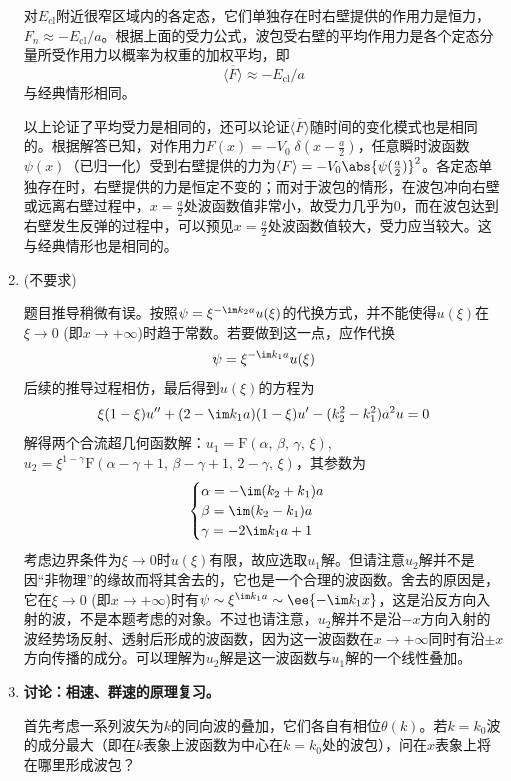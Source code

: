 \begin{enumerate}[label=\textbf{4.\arabic*}, listparindent=\parindent]
对$E_\mathrm{cl}$附近很窄区域内的各定态，它们单独存在时右壁提供的作用力是恒力，$F_n \approx -E_\mathrm{cl}/a$。根据上面的受力公式，波包受右壁的平均作用力是各个定态分量所受作用力以概率为权重的加权平均，即
\[\overline{\langle F\rangle} \approx -E_\mathrm{cl}/a\]
与经典情形相同。

以上论证了平均受力是相同的，还可以论证$\overline{\langle F\rangle}$随时间的变化模式也是相同的。根据解答已知，对作用力$F(x) = -V_0\;\delta(x-\frac{a}{2})$，任意瞬时波函数$\psi(x)$（已归一化）受到右壁提供的力为$\langle F\rangle = -V_0\abs{\psi(\frac{a}{2})}^2$。各定态单独存在时，右壁提供的力是恒定不变的；而对于波包的情形，在波包冲向右壁或远离右壁过程中，$x=\frac{a}{2}$处波函数值非常小，故受力几乎为0，而在波包达到右壁发生反弹的过程中，可以预见$x=\frac{a}{2}$处波函数值较大，受力应当较大。这与经典情形也是相同的。

\setcounter{enumi}{11}
\item (不要求)

题目推导稍微有误。按照$\psi = \xi^{-\im k_2 a}u(\xi)$的代换方式，并不能使得$u(\xi)$在$\xi\rightarrow 0$ (即$x\rightarrow+\infty$)时趋于常数。若要做到这一点，应作代换
\[\psi = \xi^{-\im k_1 a}u(\xi)\]
后续的推导过程相仿，最后得到$u(\xi)$的方程为
\[\xi(1-\xi)u''+(2-\im k_1 a)(1-\xi)u'-(k_2^2-k_1^2)a^2 u =0\]
解得两个合流超几何函数解：$u_1 = \mathrm{F}(\alpha,\,\beta,\,\gamma,\,\xi)$, $u_2 = \xi^{1-\gamma}\mathrm{F}(\alpha-\gamma+1,\,\beta-\gamma+1,\,2-\gamma,\,\xi)$，其参数为
\[\begin{cases}
\alpha = -\im(k_2+k_1)a\\
\beta = \im(k_2-k_1)a\\
\gamma = -2\im k_1 a+1
\end{cases}\]
考虑边界条件为$\xi\rightarrow 0$时$u(\xi)$有限，故应选取$u_1$解。但请注意$u_2$解并不是因“非物理”的缘故而将其舍去的，它也是一个合理的波函数。舍去的原因是，它在$\xi\rightarrow 0$ (即$x\rightarrow+\infty$)时有$\psi\sim \xi^{\im k_1 a}\sim \ee{-\im k_1 x}$，这是沿反方向入射的波，不是本题考虑的对象。不过也请注意，$u_2$解并不是沿$-x$方向入射的波经势场反射、透射后形成的波函数，因为这一波函数在$x\rightarrow +\infty$同时有沿$\pm x$方向传播的成分。可以理解为$u_2$解是这一波函数与$u_1$解的一个线性叠加。

\setcounter{enumi}{12}
\item
\noindent\textbf{\color{red}讨论：相速、群速的原理复习。}

首先考虑一系列波矢为$k$的同向波的叠加，它们各自有相位$\theta(k)$。若$k=k_0$波的成分最大（即在$k$表象上波函数为中心在$k=k_0$处的波包），问在$x$表象上将在哪里形成波包？


\end{enumerate}
